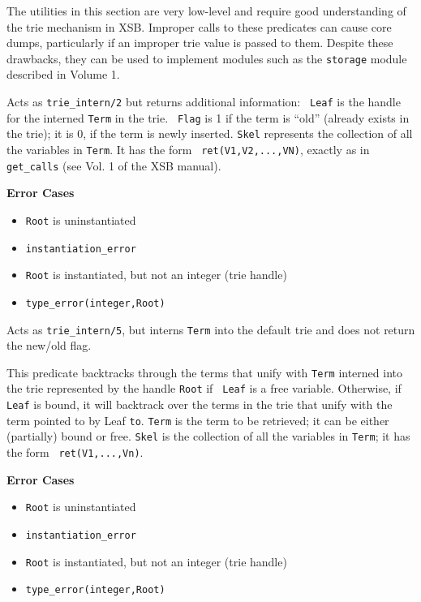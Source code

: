 {The utilities in this section are very low-level and require good
understanding of the trie mechanism in XSB.  Improper calls to these
predicates can cause core dumps, particularly if an improper trie
value is passed to them.  Despite these drawbacks, they can be used to
implement modules such as the {\tt storage} module described in Volume
1.

\begin{description}
Acts as {\tt trie\_intern/2} but returns additional information: {\tt
  Leaf} is the handle for the interned {\tt Term} in the trie.  {\tt
  Flag} is 1 if the term is ``old'' (already exists in the trie); it
is 0, if the term is newly inserted.  {\tt Skel} represents the
collection of all the variables in {\tt Term}. It has the form {\tt
  ret(V1,V2,...,VN)}, exactly as in {\tt get\_calls} (see Vol. 1 of
the XSB manual).

{\bf Error Cases}
\begin{itemize}
\item 	{\tt Root} is uninstantiated
\bi
\item 	 {\tt instantiation\_error}
\ei
\item 	{\tt Root} is instantiated, but not an integer (trie handle)
\bi
\item 	 {\tt type\_error(integer,Root)}
\ei
\end{itemize}

Acts as {\tt trie\_intern/5}, but interns {\tt Term} into the default
trie and does not return the new/old flag.

This predicate backtracks through the terms that unify with {\tt Term}
interned into the trie represented by the handle {\tt Root} if {\tt
  Leaf} is a free variable.  Otherwise, if {\tt Leaf} is bound, it
will backtrack over the terms in the trie that unify with the term
pointed to by Leaf {\tt to}.  {\tt Term} is the term to be retrieved;
it can be either (partially) bound or free.  {\tt Skel} is the
collection of all the variables in {\tt Term}; it has the form {\tt
  ret(V1,...,Vn)}.

{\bf Error Cases}
\begin{itemize}
\item 	{\tt Root} is uninstantiated
\bi
\item 	 {\tt instantiation\_error}
\ei
\item 	{\tt Root} is instantiated, but not an integer (trie handle)
\bi
\item 	 {\tt type\_error(integer,Root)}
\ei
\end{itemize}


\end{description}}
